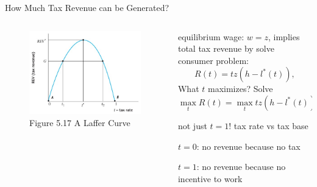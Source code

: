 \documentclass[11pt,aspectratio=169,usenames,dvipsnames]{beamer}
\let\tempone\itemize
\let\temptwo\enditemize
\renewenvironment{itemize}{\tempone\addtolength{\itemsep}{\fill}}{\temptwo}
\newcommand{\goto}[2]{\hyperlink{#2}{\beamergotobutton{#1}}}
\begin{document}
\begin{frame}{How Much Tax Revenue can be Generated?}
\label{slide:How_Much_Tax_Revenue_can_be_Generated_}
    \begin{columns}
        \begin{column}{0.5\textwidth}
            \begin{figure}
                \caption{\scriptsize Figure 5.17  A Laffer Curve}
                \includegraphics[width=\textwidth]{./figures/Figure_5_17.jpg}
            \end{figure}
            \goto{Back}{slide:Multiple_Competitive_Equilibria_Possible}
        \end{column}
        \begin{column}{0.5\textwidth}
            \small
            equilibrium wage: $ w = z $, implies \alert{total tax revenue} by solve consumer problem:
            \begin{equation*}
                R( t ) = tz( h - l^{*}( t ) )
            ,\end{equation*}
            What $ t $ maximizes? Solve
            \begin{equation*}
               \max_{t} R( t ) = \max_{t} tz( h - l^{*}( t ) )
            ,\end{equation*}
            \begin{itemize}
                \item not just $ t = 1 $! tax \alert{rate} vs tax \alert{base}
                \item $ t = 0 $: no revenue because no tax
                \item $ t = 1 $: no revenue because no incentive to work
            \end{itemize}
        \end{column}
    \end{columns}
\end{frame}
\end{document}
